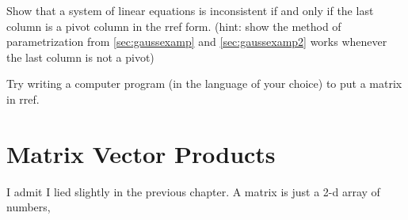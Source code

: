 \begin{Ex}
  Show that a system of linear equations is inconsistent if and only if the last column is a pivot column in the rref form.  
  (hint: show the method of parametrization from \ref{sec:gaussexamp} and \ref{sec:gaussexamp2} works whenever the last column is not a pivot)
\end{Ex}

\begin{ExProg}[(optional)]
  Try writing a computer program (in the language of your choice) to put a matrix in rref. 
\end{ExProg}



\section{Matrix Vector Products}

I admit I lied slightly in the previous chapter.
A matrix is just a 2-d array of numbers, 